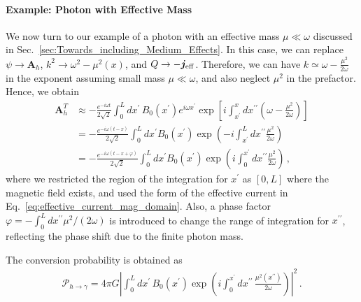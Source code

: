\documentclass[a4paper,11pt]{article}
\begin{document}
\paragraph{Example: Photon with Effective Mass}

We now turn to our example of a photon with an effective mass $ \mu  \ll \omega $ discussed in Sec.~\ref{sec:Towards_including_Medium_Effects}. In this case, we can replace $ \psi \rightarrow \bm{A}_{h} $, $ k^{2} \rightarrow \omega^{2} - \mu^{2}(x) $, and $ Q \rightarrow - \bm{j}_{\rm eff} $. Therefore, we can have $ k \simeq \omega - \frac{\mu^{2}}{2 \omega} $ in the exponent assuming small mass $ \mu \ll \omega $, and also neglect $ \mu^{2} $ in the prefactor.
%
Hence, we obtain
\begin{equation}
    \begin{aligned}
    \bm{A}_{h}^{T} & \approx - \frac{ e^{-i \omega t} }{2\sqrt{2}} \int_{0}^{L} dx^{\prime} \, B_{0}(x^{\prime}) e^{i \omega x^{\prime}}  \exp \left[ i \int_{x^{\prime}}^{x} dx^{\prime\prime}  \left( \omega - \frac{\mu^{2}}{2\omega} \right)     \right]  \\
    & = - \frac{ e^{-i \omega (t - x) } }{2\sqrt{2}} \int_{0}^{L} dx^{\prime} B_{0}(x^{\prime}) \exp \left( -i \int_{x^{\prime}}^{L} dx^{\prime\prime}    \frac{\mu^{2}}{2\omega}   \right)  \\
    & = - \frac{ e^{-i \omega (t - x + \varphi)  } }{2\sqrt{2}} \int_{0}^{L} dx^{\prime} B_{0}(x^{\prime}) \exp \left( i \int_{0}^{x^{\prime}} dx^{\prime\prime}    \frac{\mu^{2}}{2\omega}   \right)\,,
    \end{aligned}
\end{equation}
%
where we restricted the region of the integration for $ x^{\prime}$ as $[0,L]$ where the magnetic field exists, and used the form of the effective current in Eq.~\eqref{eq:effective_current_mag_domain}. Also, a phase factor $ \varphi = -\int_{0}^{L} dx^{\prime\prime} \mu^{2} / (2\omega)  $ is introduced to change the range of integration for $ x^{\prime\prime} $, reflecting the phase shift due to the finite photon mass.



The conversion probability is obtained as
\begin{align}
    \mathcal{P}_{h \rightarrow \gamma}
    = 4 \pi G  \left\vert \int_{0}^{L} dx^{\prime} \,  B_{0}(x^{\prime})  \exp \left( i \int_{0}^{x^{\prime}} dx^{\prime\prime} \, \frac{\mu^{2}(x^{\prime\prime})}{2 \omega}   \right) \right\vert^{2}\,.
\end{align}
\end{document}
